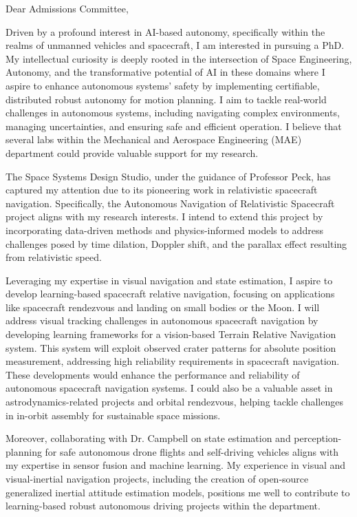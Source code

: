 \documentclass[a4,20pt]{article}
\begin{document}
\begin{large} 
Dear Admissions Committee,

Driven by a profound interest in AI-based autonomy, specifically within the realms of unmanned vehicles and spacecraft, I am interested in pursuing a PhD. My intellectual curiosity is deeply rooted in the intersection of Space Engineering, Autonomy, and the transformative potential of AI in these domains where I aspire to enhance autonomous systems' safety by implementing certifiable, distributed robust autonomy for motion planning. I aim to tackle real-world challenges in autonomous systems, including navigating complex environments, managing uncertainties, and ensuring safe and efficient operation. I believe that several labs within the Mechanical and Aerospace Engineering (MAE) department could provide valuable support for my research.


The Space Systems Design Studio, under the guidance of Professor Peck, has captured my attention due to its pioneering work in relativistic spacecraft navigation. Specifically, the Autonomous Navigation of Relativistic Spacecraft project aligns with my research interests. I intend to extend this project by incorporating data-driven methods and physics-informed models to address challenges posed by time dilation, Doppler shift, and the parallax effect resulting from relativistic speed.

Leveraging my expertise in visual navigation and state estimation, I aspire to develop learning-based spacecraft relative navigation, focusing on applications like spacecraft rendezvous and landing on small bodies or the Moon. I will address visual tracking challenges in autonomous spacecraft navigation by developing learning frameworks for a vision-based Terrain Relative Navigation system. This system will exploit observed crater patterns for absolute position measurement, addressing high reliability requirements in spacecraft navigation. These developments would enhance the performance and reliability of autonomous spacecraft navigation systems. I could also be a valuable asset in astrodynamics-related projects and orbital rendezvous, helping tackle challenges in in-orbit assembly for sustainable space missions. 

Moreover, collaborating with Dr. Campbell on state estimation and perception-planning for safe autonomous drone flights and self-driving vehicles aligns with my expertise in sensor fusion and machine learning. My experience in visual and visual-inertial navigation projects, including the creation of open-source generalized inertial attitude estimation models, positions me well to contribute to learning-based robust autonomous driving projects within the department.


\end{large}
\end{document}
